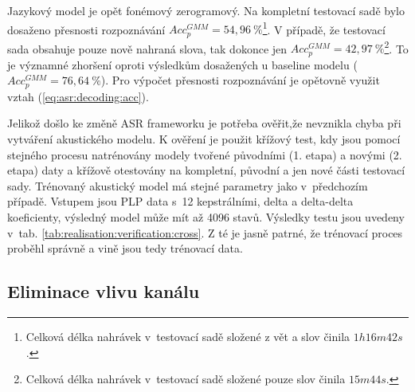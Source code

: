 Jazykový model je opět fonémový zerogramový.
Na kompletní testovací sadě bylo dosaženo přesnosti rozpoznávání $Acc_{p}^{GMM} = 54,96\ \%$\footnote{Celková délka nahrávek v~testovací sadě složené z vět a slov činila $1h16m42s$.}.
V případě, že testovací sada obsahuje pouze nově nahraná slova, tak dokonce jen $Acc_{p}^{GMM} = 42,97\ \%$\footnote{Celková délka nahrávek v~testovací sadě složené pouze slov činila $15m44s$.}.
To je významné zhoršení oproti výsledkům dosažených u baseline modelu ($Acc_{p}^{GMM} = 76,64\ \%$).
Pro výpočet přesnosti rozpoznávání je opětovně využit vztah (\ref{eq:asr:decoding:acc}).

Jelikož došlo ke změně ASR frameworku je potřeba ověřit,že nevznikla chyba při vytváření akustického modelu.
K ověření je použit křížový test, kdy jsou pomocí stejného procesu natrénovány modely tvořené původními (1. etapa) a novými (2. etapa) daty a křížově otestovány na kompletní, původní a jen nové části testovací sady.
Trénovaný akustický model má stejné parametry jako v~předchozím případě.
Vstupem jsou PLP data s~12 kepstrálními, delta a delta-delta koeficienty, výsledný model může mít až 4096 stavů.
Výsledky testu jsou uvedeny v~tab. \ref{tab:realisation:verification:cross}.
Z té je jasně patrné, že trénovací proces proběhl správně a vině jsou tedy trénovací data.


\begin{table}[htpb]
  \centering
  \def\arraystretch{1.5}
  \caption[Křížový test s~CMN.]{Křížový test modelů natrénovaných a otestovaných na datech z 1. a 2. etapy.}
  \label{tab:realisation:verification:cross}
\end{table}


\subsection{Eliminace vlivu kanálu}
\label{chap:realisation:corpus:elimination}

